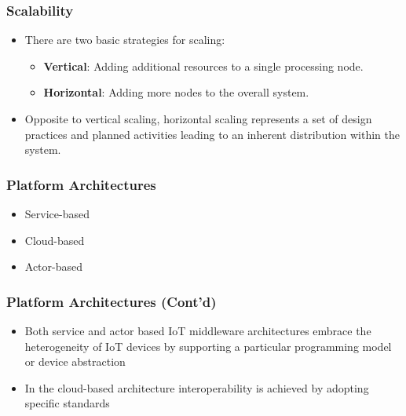 \documentclass{../iot-lecture}
\begin{document}
\begin{frame}
  \frametitle{Scalability}
  \begin{itemize}
    \item There are two basic strategies for scaling:
    \begin{itemize}
      \item \textbf{\color{RubineRed} Vertical}: Adding additional resources to a single processing node.
      \item \textbf{\color{Cyan} Horizontal}: Adding more nodes to the overall system.
    \end{itemize}
    \item Opposite to vertical scaling, horizontal scaling represents a set of design practices and
      planned activities leading to an inherent distribution within the system.
  \end{itemize}
\end{frame}

\begin{frame}
  \frametitle{Platform Architectures}
  \begin{itemize}
    \item Service-based
    \item Cloud-based
    \item Actor-based
  \end{itemize}
\end{frame}

\begin{frame}
  \frametitle{Platform Architectures (Cont'd)}
  \begin{itemize}
    \item Both service and actor based IoT middleware architectures embrace the heterogeneity
      of IoT devices by supporting a particular programming model or device abstraction
    \item In the cloud-based architecture interoperability is achieved by adopting specific standards
  \end{itemize}
\end{frame}
\end{document}
